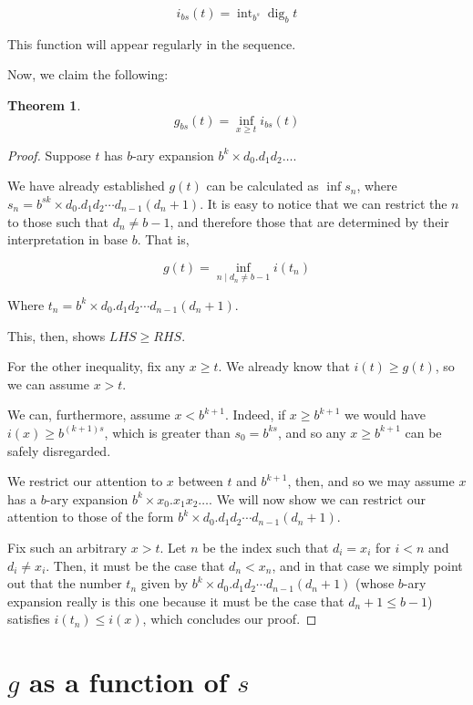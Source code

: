 \documentclass[11pt, reqno]{amsart}
\newtheorem{theorem}{Theorem}
\DeclareMathOperator{\dig}{dig}
\DeclareMathOperator{\intr}{int}
\begin{document}
\[ i_{bs}(t) = \intr_{b^s} \dig_b t \]

This function will appear regularly in the sequence.

Now, we claim the following:

\begin{theorem} \label{ginfi}
\[g_{bs}(t) = \inf_{x \geq t} i_{bs}(t)\]
\end{theorem}

\begin{proof}
Suppose $t$ has $b$-ary expansion $b^k \times d_0 . d_1 d_2 \dots$.

We have already established $g(t)$ can be calculated as $\inf s_n$, where $s_n = b^{sk} \times d_0 . d_1 d_2 \cdots d_{n-1} (d_n + 1)$. It is easy to notice that we can restrict the $n$ to those such that $d_n \neq b-1$, and therefore those that are determined by their interpretation in base $b$. That is,

\[g(t) = \inf_{n \mid d_n \neq b-1} i(t_n) \]

Where $t_n = b^k \times d_0 . d_1 d_2 \cdots d_{n-1} (d_n + 1)$.

This, then, shows $LHS \geq RHS$.

For the other inequality, fix any $x \geq t$. We already know that $i(t) \geq g(t)$, so we can assume $x > t$.

We can, furthermore, assume $x < b^{k+1}$. Indeed, if $x \geq b^{k+1}$ we would have $i(x) \geq b^{(k+1)s}$, which is greater than $s_0 = b^{ks}$, and so any $x \geq b^{k+1}$ can be safely disregarded.

We restrict our attention to $x$ between $t$ and $b^{k+1}$, then, and so we may assume $x$ has a $b$-ary expansion $b^k \times x_0 . x_1 x_2 \dots$. We will now show we can restrict our attention to those of the form $b^k \times d_0 . d_1 d_2 \cdots d_{n-1} (d_n + 1)$.

Fix such an arbitrary $x > t$. Let $n$ be the index such that $d_i = x_i$ for $i < n$ and $d_i \neq x_i$. Then, it must be the case that $d_n < x_n$, and in that case we simply point out that the number $t_n$ given by $b^k \times d_0 . d_1 d_2 \cdots d_{n-1} (d_n + 1)$ (whose $b$-ary expansion really is this one because it must be the case that $d_n + 1 \leq b-1$) satisfies $i(t_n) \leq i(x)$, which concludes our proof.
\end{proof}

\section{$g$ as a function of $s$}
\end{document}
